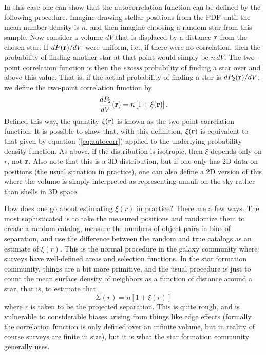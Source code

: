 In this case one can show that the autocorrelation function can be defined by the following procedure. Imagine drawing stellar positions from the PDF until the mean number density is $n$, and then imagine choosing a random star from this sample. Now consider a volume $dV$ that is displaced by a distance $\mathbf{r}$ from the chosen star. If $dP(\mathbf{r})/dV$ were uniform, i.e., if there were no correlation, then the probability of finding another star at that point would simply be $n\, dV$. The two-point correlation function is then the \textit{excess} probability of finding a star over and above this value. That is, if the actual probability of finding a star is $dP_2(\mathbf{r})/dV$, we define the two-point correlation function by
\begin{equation}
\frac{dP_2}{dV}(\mathbf{r}) = n \left[1 + \xi(\mathbf{r})\right].
\end{equation}
Defined this way, the quantity $\xi(\mathbf{r})$ is known as the two-point correlation function. It is possible to show that, with this definition, $\xi(\mathbf{r})$ is equivalent to that given by equation (\ref{eq:autocorr}) applied to the underlying probability density function. As above, if the distribution is isotropic, then $\xi$ depends only on $r$, not $\mathbf{r}$. Also note that this is a 3D distribution, but if one only has 2D data on positions (the usual situation in practice), one can also define a 2D version of this where the volume is simply interpreted as representing annuli on the sky rather than shells in 3D space.

How does one go about estimating $\xi(r)$ in practice? There are a few ways. The most sophisticated is to take the measured positions and randomize them to create a random catalog, measure the numbers of object pairs in bins of separation, and use the difference between the random and true catalogs as an estimate of $\xi(r)$. This is the normal procedure in the galaxy community where surveys have well-defined areas and selection functions. In the star formation community, things are a bit more primitive, and the usual procedure is just to count the mean surface density of neighbors as a function of distance around a star, that is, to estimate that
\begin{equation}
\Sigma(r) = n \left[1 + \xi(r)\right]
\end{equation}
where $r$ is taken to be the projected separation. This is quite rough, and is vulnerable to considerable biases arising from things like edge effects (formally the correlation function is only defined over an infinite volume, but in reality of course surveys are finite in size), but it is what the star formation community generally uses.

